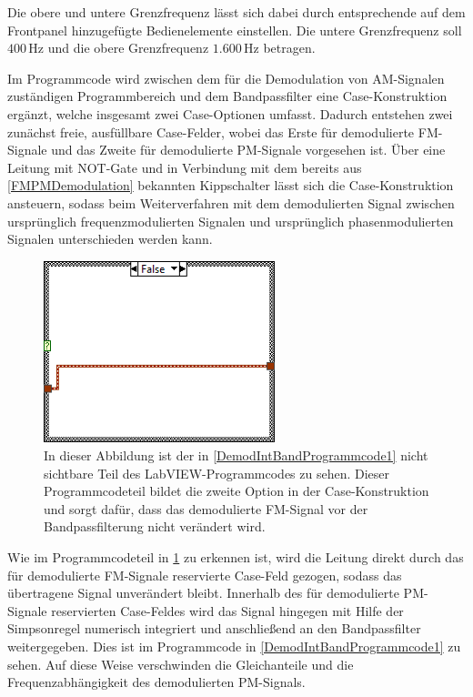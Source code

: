 \documentclass[
a4paper,
12pt,
pagesize,
ngerman
]{scrartcl}
\begin{document}
	\noindent Die obere und untere Grenzfrequenz lässt sich dabei durch entsprechende auf dem Frontpanel hinzugefügte Bedienelemente einstellen.
	Die untere Grenzfrequenz soll $400\,$Hz und die obere Grenzfrequenz $1.600\,$Hz betragen.
	
	Im Programmcode wird zwischen dem für die Demodulation von AM-Signalen zuständigen Programmbereich und dem Bandpassfilter eine Case-Konstruktion ergänzt, welche insgesamt zwei Case-Optionen umfasst.
	Dadurch entstehen zwei zunächst freie, ausfüllbare Case-Felder, wobei das Erste für demodulierte FM-Signale und das Zweite für demodulierte PM-Signale vorgesehen ist.
	Über eine Leitung mit NOT-Gate und in Verbindung mit dem bereits aus \cref{FMPMDemodulation} bekannten Kippschalter lässt sich die Case-Konstruktion ansteuern, sodass beim Weiterverfahren mit dem demodulierten Signal zwischen ursprünglich frequenzmodulierten Signalen und ursprünglich phasenmodulierten Signalen unterschieden werden kann.
	
	\begin{figure}[H]
		\centering
		\includegraphics[width=0.6\textwidth]{EIRE2018Dateien/Tag4/OsziFMPM-Demod/mitBandpassUndIntegrationBilder/OsziPlusFMPMd6}
		\caption{In dieser Abbildung ist der in \cref{DemodIntBandProgrammcode1} nicht sichtbare Teil des LabVIEW-Programmcodes zu sehen. Dieser Programmcodeteil bildet die zweite Option in der Case-Konstruktion und sorgt dafür, dass das demodulierte FM-Signal vor der Bandpassfilterung nicht verändert wird.}
		\label{DemodIntBandProgrammcode2}
	\end{figure}
	
	\noindent Wie im Programmcodeteil in \cref{DemodIntBandProgrammcode2} zu erkennen ist, wird die Leitung direkt durch das für demodulierte FM-Signale reservierte Case-Feld gezogen, sodass das übertragene Signal unverändert bleibt.
	Innerhalb des für demodulierte PM-Signale reservierten Case-Feldes wird das Signal hingegen mit Hilfe der Simpsonregel numerisch integriert und anschließend an den Bandpassfilter weitergegeben.
	Dies ist im Programmcode in \cref{DemodIntBandProgrammcode1} zu sehen.
	Auf diese Weise verschwinden die Gleichanteile und die Frequenzabhängigkeit des demodulierten PM-Signals.
	
\end{document}
